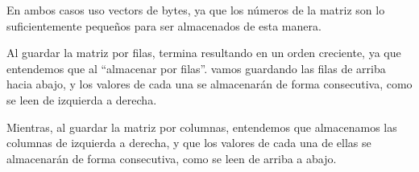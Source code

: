 \documentclass[a4paper]{report}
\begin{document}
\inputminted{mips}{src/problemas/6.asm}

En ambos casos uso vectors de bytes, ya que los números de la matriz son lo suficientemente pequeños para ser almacenados de esta manera.

Al guardar la matriz por filas, termina resultando en un orden creciente, ya que entendemos que al ``almacenar por filas''. vamos guardando las filas de arriba hacia abajo, y los valores de cada una se almacenarán de forma consecutiva, como se leen de izquierda a derecha.

Mientras, al guardar la matriz por columnas, entendemos que almacenamos las columnas de izquierda a derecha, y que los valores de cada una de ellas se almacenarán de forma consecutiva, como se leen de arriba a abajo.

\begin{figure}[h]
    \centering
    \captionsetup{justification = centering}


\end{figure}
\end{document}
